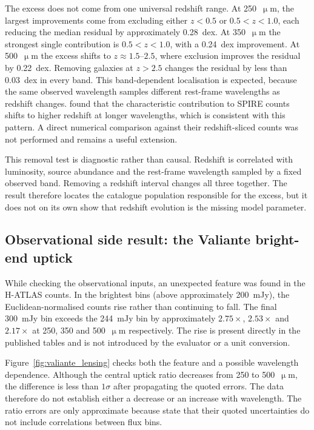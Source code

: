 \documentclass[12pt,a4paper]{article}
\begin{document}
The excess does not come from one universal redshift range. At 250~$\upmu$m, the
largest improvements come from excluding either $z<0.5$ or $0.5<z<1.0$, each reducing
the median residual by approximately \SI{0.28}{dex}. At 350~$\upmu$m the strongest
single contribution is $0.5<z<1.0$, with a \SI{0.24}{dex} improvement. At
500~$\upmu$m the excess shifts to $z \approx 1.5$--$2.5$, where exclusion improves the
residual by \SI{0.22}{dex}. Removing galaxies at $z>2.5$ changes the residual by less
than \SI{0.03}{dex} in every band. This band-dependent localisation is expected, because
the same observed wavelength samples different rest-frame wavelengths as redshift
changes. \citet{B_thermin_2012} found that the characteristic
contribution to SPIRE counts shifts to higher redshift at longer wavelengths, which is
consistent with this pattern. A direct numerical comparison against their
redshift-sliced counts was not performed and remains a useful extension.

This removal test is diagnostic rather than causal. Redshift is correlated with
luminosity, source abundance and the rest-frame wavelength sampled by a fixed observed
band. Removing a redshift interval changes all three together. The result therefore
locates the catalogue population responsible for the excess, but it does not on its own
show that redshift evolution is the missing model parameter.

\subsection{Observational side result: the Valiante bright-end uptick}
\label{sec:results:valiante}

While checking the observational inputs, an unexpected feature was found in the
\citet{Valiante_2016} H-ATLAS counts. In the brightest bins (above approximately
\SI{200}{mJy}), the Euclidean-normalised counts rise rather than continuing to fall.
The final \SI{300}{mJy} bin exceeds the \SI{244}{mJy} bin by approximately
$2.75\times$, $2.53\times$ and $2.17\times$ at 250, 350 and 500~$\upmu$m respectively.
The rise is present directly in the published tables and is not introduced by the
evaluator or a unit conversion.

Figure~\ref{fig:valiante_lensing} checks both the feature and a possible wavelength
dependence. Although the central uptick ratio decreases from 250 to 500~$\upmu$m, the
difference is less than $1\sigma$ after propagating the quoted errors. The data therefore
do not establish either a decrease or an increase with wavelength. The ratio errors are
only approximate because \citet{Valiante_2016} state that their quoted uncertainties do
not include correlations between flux bins.
\end{document}
